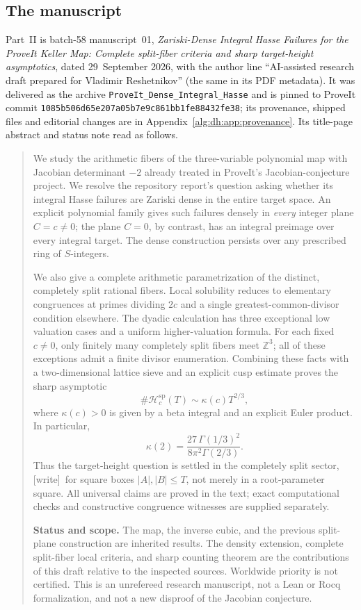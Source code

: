 \documentclass[11pt]{article}
\numberwithin{equation}{section}
\theoremstyle{plain}
\theoremstyle{plain}
\theoremstyle{plain}
\theoremstyle{definition}
\theoremstyle{definition}
\theoremstyle{definition}
\theoremstyle{remark}
\newcommand{\Z}{\mathbb Z}\newcommand{\Q}{\mathbb Q}
\newcommand{\wtag}{\textup{[write]}}%
\newcommand{\dhsha}{\nolinkurl{1085b506d65e207a05b7e9c861bb1fe88432fe38}}
\newcommand{\Hsplit}{\mathcal H^{\mathrm{sp}}}
\begin{document}
\subsection{The manuscript}\label{alg:dh:sec:source}
Part~II is batch-58 manuscript~01, \emph{Zariski-Dense Integral Hasse
Failures for the ProveIt Keller Map: Complete split-fiber criteria and
sharp target-height asymptotics}, dated 29~September 2026, with the
author line ``AI-assisted research draft prepared for Vladimir
Reshetnikov'' (the same in its PDF metadata). It was delivered as the
archive \texttt{ProveIt\_Dense\_Integral\_Hasse} and is pinned to ProveIt
commit \dhsha; its provenance, shipped files and editorial changes are in
Appendix~\ref{alg:dh:app:provenance}. Its title-page abstract and status
note read as follows.
\begin{quote}\small
We study the arithmetic fibers of the three-variable polynomial map with
Jacobian determinant $-2$ already treated in ProveIt's Jacobian-conjecture
project. We resolve the repository report's question asking whether its
integral Hasse failures are Zariski dense in the entire target space.
An explicit polynomial family gives such failures densely in \emph{every}
integer plane $C=c\ne0$; the plane $C=0$, by contrast, has an integral
preimage over every integral target. The dense construction persists over
any prescribed ring of $S$-integers.

We also give a complete arithmetic parametrization of the distinct,
completely split rational fibers. Local solubility reduces to elementary
congruences at primes dividing $2c$ and a single greatest-common-divisor
condition elsewhere. The dyadic calculation has three exceptional low
valuation cases and a uniform higher-valuation formula. For each fixed
$c\ne0$, only finitely many completely split fibers meet $\Z^3$; all of
these exceptions admit a finite divisor enumeration. Combining these
facts with a two-dimensional lattice sieve and an explicit cusp estimate
proves the sharp asymptotic
\[
 \#\Hsplit_c(T)\sim \kappa(c)T^{2/3},
\]
where $\kappa(c)>0$ is given by a beta integral and an explicit Euler
product. In particular,
\[
 \kappa(2)=\frac{27\,\Gamma(1/3)^2}{8\pi^2\Gamma(2/3)}.
\]
Thus the target-height question is settled in the completely split sector,
\wtag{}~for square boxes $|A|,|B|\le T$,
not merely in a root-parameter square. All universal claims are proved in
the text; exact computational checks and constructive congruence witnesses
are supplied separately.

\textbf{Status and scope.} The map, the inverse cubic, and the previous
split-plane construction are inherited results. The density extension,
complete split-fiber local criteria, and sharp counting theorem are the
contributions of this draft relative to the inspected sources. Worldwide
priority is not certified. This is an unrefereed research manuscript,
not a Lean or Rocq formalization, and not a new disproof of the Jacobian
conjecture.
\end{quote}
\end{document}
